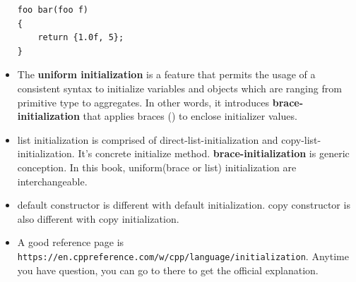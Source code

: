 \documentclass[a4paper,11pt,twoside]{book}
\begin{document}
\begin{itemize}
\begin{lstlisting}[numbers=none]	
foo bar(foo f)
{
	return {1.0f, 5};
}
\end{lstlisting}

	\item The \textbf{uniform initialization} is a feature that permits the usage of a consistent syntax to initialize variables and objects which are ranging from primitive type to aggregates. In other words, it introduces \textbf{brace-initialization} that applies braces ({}) to enclose initializer values.
	
	\item list initialization is comprised of direct-list-initialization and copy-list-initialization. It's concrete initialize method. \textbf{brace-initialization} is generic conception. In this book, uniform(brace or list) initialization are interchangeable. 
	
	\item default constructor is different with default initialization. copy constructor is also different with copy initialization.
	
	\item A good reference page is \verb|https://en.cppreference.com/w/cpp/language/initialization|. Anytime you have question, you can go to there to get the official explanation. 
\end{itemize}
\end{document}
